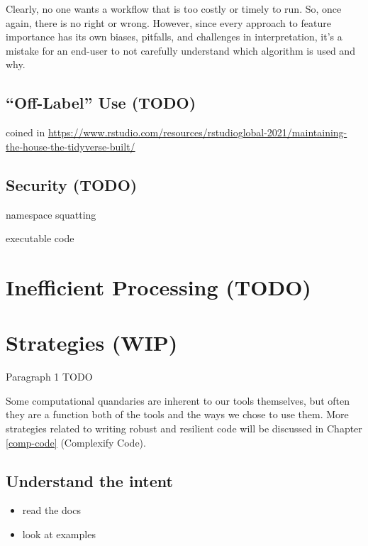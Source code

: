 \documentclass[
]{krantz}
\providecommand{\tightlist}{%
  \setlength{\itemsep}{0pt}\setlength{\parskip}{0pt}}
\begin{document}
Clearly, no one wants a workflow that is too costly or timely to run. So, once again, there is no right or wrong. However, since every approach to feature importance has its own biases, pitfalls, and challenges in interpretation, it's a mistake for an end-user to not carefully understand which algorithm is used and why.

\hypertarget{off-label-use-todo}{%
\subsection{``Off-Label'' Use (TODO)}\label{off-label-use-todo}}

coined in \url{https://www.rstudio.com/resources/rstudioglobal-2021/maintaining-the-house-the-tidyverse-built/}

\hypertarget{security-todo}{%
\subsection{Security (TODO)}\label{security-todo}}

namespace squatting

executable code

\hypertarget{inefficient-processing-todo}{%
\section{Inefficient Processing (TODO)}\label{inefficient-processing-todo}}

\hypertarget{strategies-wip}{%
\section{Strategies (WIP)}\label{strategies-wip}}

Paragraph 1 TODO

Some computational quandaries are inherent to our tools themselves, but often they are a function both of the tools and the ways we chose to use them. More strategies related to writing robust and resilient code will be discussed in Chapter \ref{comp-code} (Complexify Code).

\hypertarget{understand-the-intent-1}{%
\subsection{Understand the intent}\label{understand-the-intent-1}}

\begin{itemize}
\tightlist
\item
  read the docs
\item
  look at examples
\end{itemize}
\end{document}
